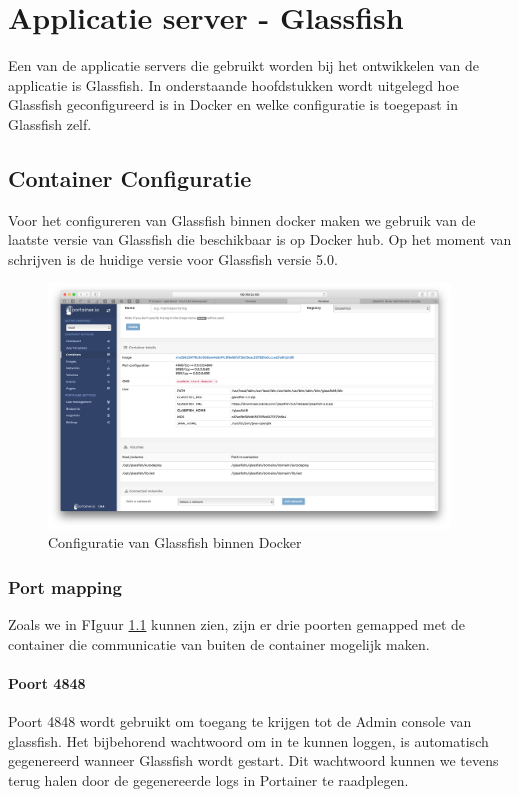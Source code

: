 \chapter{Applicatie server - Glassfish}
Een van de applicatie servers die gebruikt worden bij het ontwikkelen van de applicatie is Glassfish. In onderstaande hoofdstukken wordt uitgelegd hoe Glassfish geconfigureerd is in Docker en welke configuratie is toegepast in Glassfish zelf.

\section{Container Configuratie}
Voor het configureren van Glassfish binnen docker maken we gebruik van de laatste versie van Glassfish die beschikbaar is op Docker hub. Op het moment van schrijven is de huidige versie voor Glassfish versie 5.0.

\begin{figure}[H]
	\centering
	\includegraphics[width=0.95\textwidth]{img/GlassfishConfiguration.png}
	\caption{Configuratie van Glassfish binnen Docker}
	\label{fig:GlassfishConfiguration}
\end{figure}

\subsection{Port mapping}
Zoals we in FIguur \ref{fig:GlassfishConfiguration} kunnen zien, zijn er drie poorten gemapped met de container die communicatie van buiten de container mogelijk maken.

\subsubsection{Poort 4848}
Poort 4848 wordt gebruikt om toegang te krijgen tot de Admin console van glassfish. Het bijbehorend wachtwoord om in te kunnen loggen, is automatisch gegenereerd wanneer Glassfish wordt gestart. Dit wachtwoord kunnen we tevens terug halen door de gegenereerde logs in Portainer te raadplegen.
\newpage
